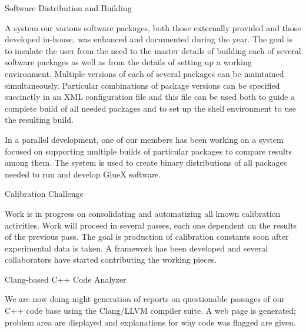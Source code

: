 Software Distribution and Building

A system our various software packages, both those externally provided
and those developed in-house, was enhanced and documented during the
year. The goal is to insulate the user from the need to the master
details of building each of several software packages as well as from
the details of setting up a working environment. Multiple versions of
each of several packages can be maintained simultaneously. Particular
combinations of package versions can be specified succinctly in an XML
configuration file and this file can be used both to guide a complete
build of all needed packages and to set up the shell environment to
use the resulting build.

In a parallel development, one of our members has been working on a
system focused on supporting multiple builds of particular packages to
compare results among them. The system is used to create binary
distributions of all packages needed to run and develop GlueX
software.

Calibration Challenge

Work is in progress on consolidating and automatizing all known calibration activities. Work will proceed in several passes, each one dependent on the results of the previous pass. The goal is production of calibration constants soon after experimental data is taken. A framework has been developed and several collaborators have started contributing the working pieces.

Clang-based C++ Code Analyzer

We are now doing night generation of reports on questionable passages of our C++ code base using the Clang/LLVM compiler suite. A web page is generated; problem area are displayed and explanations for why code was flagged are given.
